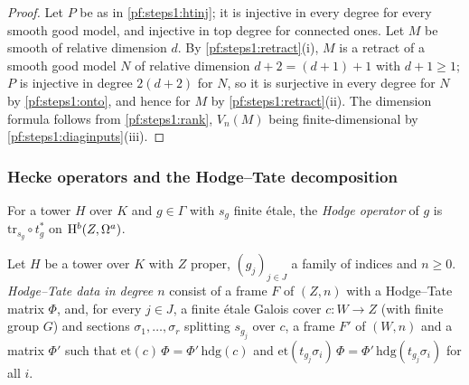\begin{proof}
Let $P$ be as in \cref{pf:steps1:htinj}; it is injective in every degree for every smooth good model, and injective in top
degree for connected ones. Let $M$ be smooth of relative dimension $d$. By \cref{pf:steps1:retract}(i), $M$ is a retract of a
smooth good model $N$ of relative dimension $d+2=(d+1)+1$ with $d+1\ge1$; $P$ is injective in degree $2(d+2)$ for $N$, so it is
surjective in every degree for $N$ by \cref{pf:steps1:onto}, and hence for $M$ by \cref{pf:steps1:retract}(ii). The dimension
formula follows from \cref{pf:steps1:rank}, $V_n(M)$ being finite-dimensional by \cref{pf:steps1:diaginputs}(iii).
\end{proof}

\subsubsection{Hecke operators and the Hodge--Tate decomposition}

For a tower $H$ over $K$ and $g\in\Gamma$ with $s_g$ finite \'etale, the \emph{Hodge operator} of $g$ is
$\mathrm{tr}_{s_g}\circ t_g^*$ on $\mathrm{H}^b(Z,\Omega^a)$.

\begin{definition}\label{pf:steps1:def:htcover}
Let $H$ be a tower over $K$ with $Z$ proper, $(g_j)_{j\in J}$ a family of indices and $n\ge0$. \emph{Hodge--Tate
data in degree $n$} consist of a frame $F$ of $(Z,n)$ with a Hodge--Tate matrix $\Phi$, and, for every $j\in J$,
a finite \'etale Galois cover $c\colon W\to Z$ (with finite group $G$) and sections $\sigma_1,\dots,\sigma_r$
splitting $s_{g_j}$ over $c$, a frame $F'$ of $(W,n)$ and a matrix $\Phi'$ such that
$\mathrm{et}(c)\,\Phi=\Phi'\,\mathrm{hdg}(c)$ and $\mathrm{et}(t_{g_j}\sigma_i)\,\Phi=\Phi'\,\mathrm{hdg}(t_{g_j}\sigma_i)$
for all $i$. 
\end{definition}

